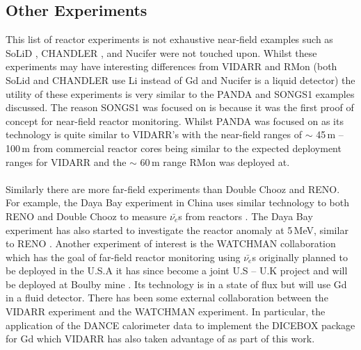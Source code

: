 \subsection{Other Experiments}
This list of reactor experiments is not exhaustive near-field examples such as SoLiD \cite{Solid_readout}, CHANDLER \cite{aap2015}, and Nucifer \cite{nucifer2016} were not touched upon. Whilst these experiments may have interesting differences from VIDARR and RMon (both SoLid and CHANDLER use Li instead of Gd and Nucifer is a liquid detector) the utility of these experiments is very similar to the PANDA and SONGS1 examples discussed. The reason SONGS1 was focused on is because it was the first proof of concept for near-field reactor monitoring. Whilst PANDA was focused on as its technology is quite similar to VIDARR's with the near-field ranges of $\sim$ 45\,m -- 100\,m from commercial reactor cores being similar to the expected deployment ranges for VIDARR and the $\sim$ 60\,m range RMon was deployed at. 
\\\\Similarly there are more far-field experiments than Double Chooz and RENO. For example, the Daya Bay experiment in China uses similar technology to both RENO and Double Chooz to measure $\bar{\nu_e}$s from reactors \cite{DayaBay2007Precision}. The Daya Bay experiment has also started to investigate the reactor anomaly at 5\,MeV, similar to RENO \cite{Daya_Bay_2017}. Another experiment of interest is the WATCHMAN collaboration which has the goal of far-field reactor monitoring using $\bar{\nu_e}$s originally planned to be deployed in the U.S.A \cite{askins2015physics} it has since become a joint U.S -- U.K project and will be deployed at Boulby mine \cite{burns2018remote}. Its technology is in a state of flux but will use Gd in a fluid detector. There has been some external collaboration between the VIDARR experiment and the WATCHMAN experiment. In particular, the application of the DANCE calorimeter data to implement the DICEBOX package for Gd which VIDARR has also taken advantage of as part of this work. 


